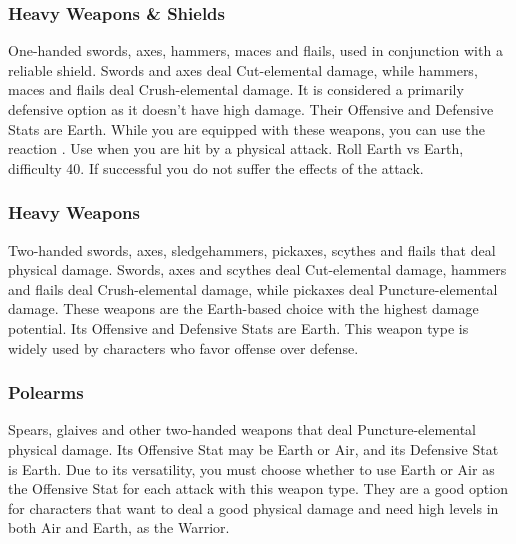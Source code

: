 \begin{tabwpn}[label=inv-lsword,range=melee,type=physical,element=puncture,roll=airvair]
    
\end{tabwpn}
\clearpage
\subsubsection{Heavy Weapons \& Shields}

One-handed swords, axes, hammers, maces and flails, used in conjunction with a reliable shield. Swords and axes deal Cut-elemental damage, while hammers, maces and flails deal Crush-elemental damage. It is considered a primarily defensive option as it doesn’t have high damage. Their Offensive and Defensive Stats are Earth. While you are equipped with these weapons, you can use the reaction . Use when you are hit by a physical attack. Roll Earth vs Earth, difficulty 40. If successful you do not suffer the effects of the attack.

\begin{tabwpn}[label=inv-hwpnshld,range=melee,type=physical,element=*,roll=earthvearth]
    
\end{tabwpn}
\clearpage
\subsubsection{Heavy Weapons}

Two-handed swords, axes, sledgehammers, pickaxes, scythes and flails that deal physical damage. Swords, axes and scythes deal Cut-elemental damage, hammers and flails deal Crush-elemental damage, while pickaxes deal Puncture-elemental damage. These weapons are the Earth-based choice with the highest damage potential. Its Offensive and Defensive Stats are Earth. This weapon type is widely used by characters who favor offense over defense.

\begin{tabwpn}[label=inv-hwpn,range=melee,type=physical,element=*,roll=earthvearth]
    
\end{tabwpn}
\clearpage

\subsubsection{Polearms}

Spears, glaives and other two-handed weapons that deal Puncture-elemental physical damage. Its Offensive Stat may be Earth or Air, and its Defensive Stat is Earth. Due to its versatility, you must choose whether to use Earth or Air as the Offensive Stat for each attack with this weapon type. They are a good option for characters that want to deal a good physical damage and need high levels in both Air and Earth, as the Warrior. 

